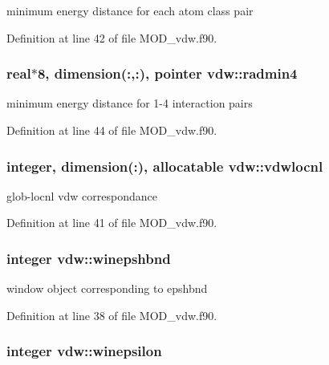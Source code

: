 minimum energy distance for each atom class pair 



Definition at line 42 of file M\-O\-D\-\_\-vdw.\-f90.

\hypertarget{classvdw_a6b56f2ac675c5d7c8c776c2d6588a902}{
\subsubsection[{radmin4}]{\setlength{\rightskip}{0pt plus 5cm}real$\ast$8, dimension(\-:,\-:), pointer vdw\-::radmin4}}\label{classvdw_a6b56f2ac675c5d7c8c776c2d6588a902}


minimum energy distance for 1-\/4 interaction pairs 



Definition at line 44 of file M\-O\-D\-\_\-vdw.\-f90.

\hypertarget{classvdw_a00f7569676b7321ddce0cbd95bd9194a}{
\subsubsection[{vdwlocnl}]{\setlength{\rightskip}{0pt plus 5cm}integer, dimension(\-:), allocatable vdw\-::vdwlocnl}}\label{classvdw_a00f7569676b7321ddce0cbd95bd9194a}


glob-\/locnl vdw correspondance 



Definition at line 41 of file M\-O\-D\-\_\-vdw.\-f90.

\hypertarget{classvdw_af2f988f5bda479a9434fd55813e86f1f}{
\subsubsection[{winepshbnd}]{\setlength{\rightskip}{0pt plus 5cm}integer vdw\-::winepshbnd}}\label{classvdw_af2f988f5bda479a9434fd55813e86f1f}


window object corresponding to epshbnd 



Definition at line 38 of file M\-O\-D\-\_\-vdw.\-f90.

\hypertarget{classvdw_af61591d1fb9c9a51bc99f386b70d5aa3}{
\subsubsection[{winepsilon}]{\setlength{\rightskip}{0pt plus 5cm}integer vdw\-::winepsilon}}\label{classvdw_af61591d1fb9c9a51bc99f386b70d5aa3}


